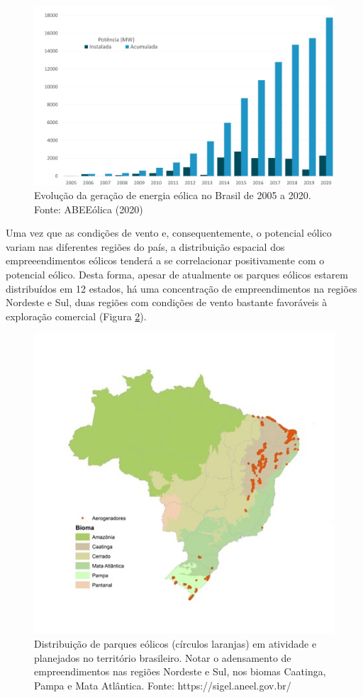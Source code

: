 \documentclass[
  oneside]{scrbook}
\begin{document}
\begin{figure}[H]

{\centering \includegraphics[width=0.7\linewidth]{imagens/cap01/Figura_1.3} 

}

\caption{Evolução da geração de energia eólica no Brasil de 2005 a 2020. Fonte: ABEEólica (2020)}\label{fig:03}
\end{figure}

Uma vez que as condições de vento e, consequentemente, o potencial eólico variam nas diferentes regiões do país, a distribuição espacial dos empreeendimentos eólicos tenderá a se correlacionar positivamente com o potencial eólico. Desta forma, apesar de atualmente os parques eólicos estarem distribuídos em 12 estados, há uma concentração de empreendimentos na regiões Nordeste e Sul, duas regiões com condições de vento bastante favoráveis à exploração comercial (Figura \ref{fig:04}).

\begin{figure}[H]

{\centering \includegraphics[width=0.55\linewidth]{imagens/cap01/Figura_1.4} 

}

\caption{Distribuição de parques eólicos (círculos laranjas) em atividade e planejados no território brasileiro. Notar o adensamento de empreendimentos nas regiões Nordeste e Sul, nos biomas Caatinga, Pampa e Mata Atlântica. Fonte: https://sigel.aneel.gov.br/}\label{fig:04}
\end{figure}
\end{document}
